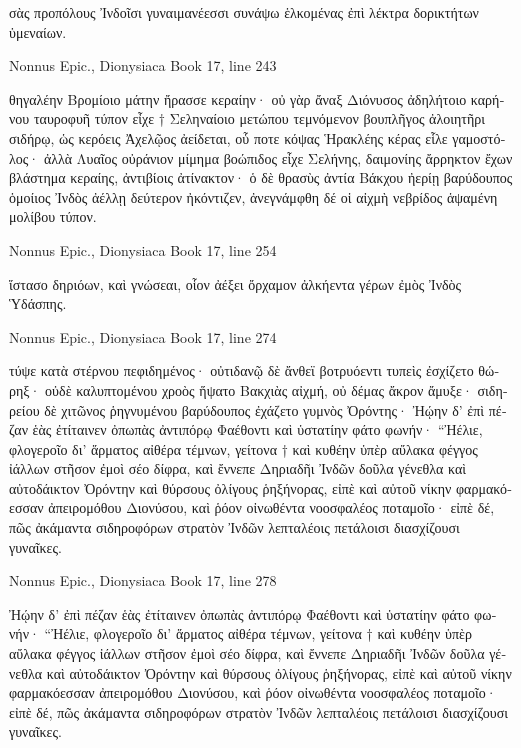 \documentclass[12pt,letterpaper,twoside,final]{memoir}
\begin{document}
\begin{greek}
σὰς προπόλους Ἰνδοῖσι γυναιμανέεσσι συνάψω 
ἑλκομένας ἐπὶ λέκτρα δορικτήτων ὑμεναίων. 



Nonnus Epic., Dionysiaca 
Book 17, line 243

θηγαλέην Βρομίοιο μάτην ἤρασσε κεραίην· 
οὐ γὰρ ἄναξ Διόνυσος ἀδηλήτοιο καρήνου 
ταυροφυῆ τύπον εἶχε † Σεληναίοιο μετώπου 
τεμνόμενον βουπλῆγος ἀλοιητῆρι σιδήρῳ, 
ὡς κερόεις Ἀχελῷος ἀείδεται, οὗ ποτε κόψας 
Ἡρακλέης κέρας εἷλε γαμοστόλος· ἀλλὰ Λυαῖος 
οὐράνιον μίμημα βοώπιδος εἶχε Σελήνης, 
δαιμονίης ἄρρηκτον ἔχων βλάστημα κεραίης, 
ἀντιβίοις ἀτίνακτον· ὁ δὲ θρασὺς ἀντία Βάκχου 
ἠερίῃ βαρύδουπος ὁμοίιος Ἰνδὸς ἀέλλῃ 
δεύτερον ἠκόντιζεν, ἀνεγνάμφθη δέ οἱ αἰχμὴ 
νεβρίδος ἁψαμένη μολίβου τύπον. 



Nonnus Epic., Dionysiaca 
Book 17, line 254

ἵστασο δηριόων, καὶ γνώσεαι, οἷον ἀέξει 
ὄρχαμον ἀλκήεντα γέρων ἐμὸς Ἰνδὸς Ὑδάσπης. 



Nonnus Epic., Dionysiaca 
Book 17, line 274

τύψε κατὰ στέρνου πεφιδημένος· οὐτιδανῷ δὲ 
ἄνθεϊ βοτρυόεντι τυπεὶς ἐσχίζετο θώρηξ· 
οὐδὲ καλυπτομένου χροὸς ἥψατο Βακχιὰς αἰχμή, 
οὐ δέμας ἄκρον ἄμυξε· σιδηρείου δὲ χιτῶνος 
ῥηγνυμένου βαρύδουπος ἐχάζετο γυμνὸς Ὀρόντης· 
Ἠῴην δ' ἐπὶ πέζαν ἑὰς ἐτίταινεν ὀπωπὰς 
ἀντιπόρῳ Φαέθοντι καὶ ὑστατίην φάτο φωνήν· 
 “Ἠέλιε, φλογεροῖο δι' ἅρματος αἰθέρα τέμνων,   
γείτονα † καὶ κυθέην ὑπὲρ αὔλακα φέγγος ἰάλλων 
στῆσον ἐμοὶ σέο δίφρα, καὶ ἔννεπε Δηριαδῆι 
Ἰνδῶν δοῦλα γένεθλα καὶ αὐτοδάικτον Ὀρόντην 
καὶ θύρσους ὀλίγους ῥηξήνορας, εἰπὲ καὶ αὐτοῦ 
νίκην φαρμακόεσσαν ἀπειρομόθου Διονύσου, 
καὶ ῥόον οἰνωθέντα νοοσφαλέος ποταμοῖο· 
εἰπὲ δέ, πῶς ἀκάμαντα σιδηροφόρων στρατὸν Ἰνδῶν 
λεπταλέοις πετάλοισι διασχίζουσι γυναῖκες. 



Nonnus Epic., Dionysiaca 
Book 17, line 278

Ἠῴην δ' ἐπὶ πέζαν ἑὰς ἐτίταινεν ὀπωπὰς 
ἀντιπόρῳ Φαέθοντι καὶ ὑστατίην φάτο φωνήν· 
 “Ἠέλιε, φλογεροῖο δι' ἅρματος αἰθέρα τέμνων,   
γείτονα † καὶ κυθέην ὑπὲρ αὔλακα φέγγος ἰάλλων 
στῆσον ἐμοὶ σέο δίφρα, καὶ ἔννεπε Δηριαδῆι 
Ἰνδῶν δοῦλα γένεθλα καὶ αὐτοδάικτον Ὀρόντην 
καὶ θύρσους ὀλίγους ῥηξήνορας, εἰπὲ καὶ αὐτοῦ 
νίκην φαρμακόεσσαν ἀπειρομόθου Διονύσου, 
καὶ ῥόον οἰνωθέντα νοοσφαλέος ποταμοῖο· 
εἰπὲ δέ, πῶς ἀκάμαντα σιδηροφόρων στρατὸν Ἰνδῶν 
λεπταλέοις πετάλοισι διασχίζουσι γυναῖκες. 




\end{greek}
\end{document}
